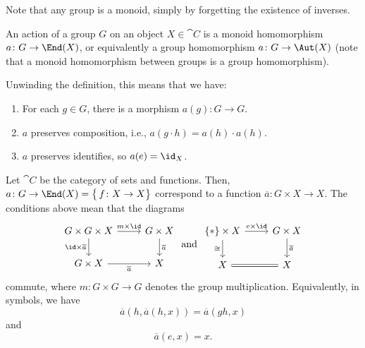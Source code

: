 \documentclass{willowtreebook}
\begin{document}
Note that any group is a monoid, simply by forgetting the existence of inverses. 
\begin{definition}\label{def:group-action}
    An action of a group $G$ on an object $X \in \cat C$ is a monoid homomorphism $a \colon G \to \End(X)$, or equivalently a group homomorphism $a \colon G \to \Aut(X)$ (note that a monoid homomorphism between groups is a group homomorphism). 
\end{definition}
\begin{remark}
    Unwinding the definition, this means that we have:
    \begin{enumerate}
        \item For each $g \in G$, there is a morphism $a(g) \colon G \to G$.
        \item $a$ preserves composition, i.e., $a(g \cdot h) = a(h) \cdot a(h)$. 
        \item $a$ preserves identifies, so $a(e) = \id_X$.
    \end{enumerate}
\end{remark}
\begin{example}
    Let $\cat C$ be the category of sets and functions. Then, $a \colon G \to \End(X) = \big\{\,f \colon X \to X\big\}$ correspond to a function $\overline{a} \colon G \times X \to X$. The conditions above mean that the diagrams
\[\begin{tikzcd}[ampersand replacement=\&]
	{G \times G \times X} \& {G \times X} \\
	{G \times X} \& X
	\arrow["{\id \times \overline{a}}"', from=1-1, to=2-1]
	\arrow["{m \times \id}", from=1-1, to=1-2]
	\arrow["{\overline{a}}", from=1-2, to=2-2]
	\arrow["{\overline{a}}"', from=2-1, to=2-2]
\end{tikzcd}
\text{ and }
\begin{tikzcd}[ampersand replacement=\&]
	{\{\ast\} \times X} \& {G \times X} \\
	X \& X
	\arrow["{e \times \id}", from=1-1, to=1-2]
	\arrow["\cong"', from=1-1, to=2-1]
	\arrow["{\overline{a}}", from=1-2, to=2-2]
	\arrow[Rightarrow, no head, from=2-1, to=2-2]
\end{tikzcd}\]
commute, where $m \colon G \times G \to G$ denotes the group multiplication. Equivalently, in symbols, we have
\[
\overline{a}(h,\overline{a}(h,x)) = \overline{a}(gh,x) 
\]
and
\[
\overline{a}(e,x) = x. 
\]
\end{example}
\end{document}

